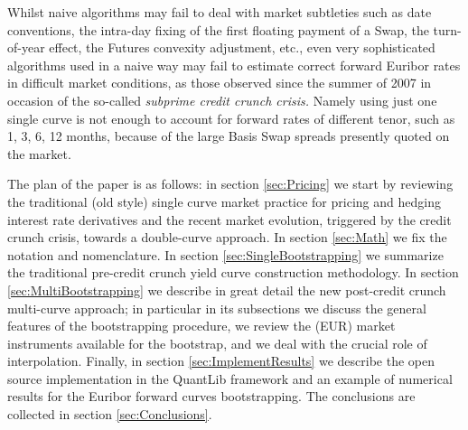 \documentclass[11pt,reqno]{amsart}
\begin{document}
\par
Whilst naive algorithms may fail to deal with market subtleties such as date conventions, the intra-day fixing of the first floating payment of a Swap, the turn-of-year effect, the Futures convexity adjustment, etc., even very sophisticated algorithms used in a naive way may fail to estimate correct forward Euribor rates in difficult market conditions, as those observed since the summer of 2007 in occasion of the so-called {\it subprime credit crunch crisis.}
Namely using just one single curve is not enough to account for forward rates of different tenor, such as 1, 3, 6, 12 months, because of the large Basis Swap spreads presently quoted on the market.
\par
The plan of the paper is as follows:
in section \ref{sec:Pricing} we start by reviewing the traditional (old style) single curve market practice for pricing and hedging interest rate derivatives and the recent market evolution, triggered by the credit crunch crisis, towards a double-curve approach.
In section \ref{sec:Math} we fix the notation and nomenclature.
In section \ref{sec:SingleBootstrapping} we summarize the traditional pre-credit crunch yield curve construction methodology.
In section \ref{sec:MultiBootstrapping} we describe in great detail the new post-credit crunch multi-curve approach; in particular in its subsections we discuss the general features of the bootstrapping procedure, we review the (EUR) market instruments available for the bootstrap, and we deal with the crucial role of interpolation.
Finally, in section \ref{sec:ImplementResults} we describe the open source implementation in the QuantLib framework and an example of numerical results for the Euribor forward curves bootstrapping.
The conclusions are collected in section \ref{sec:Conclusions}.
\end{document}
